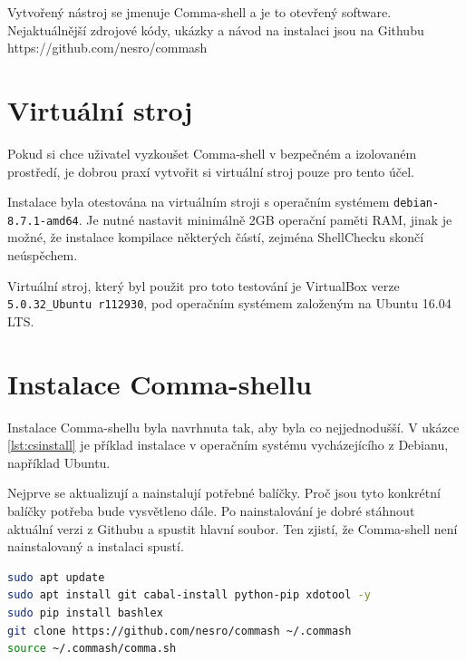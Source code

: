 \documentclass[thesis=M,czech]{FITthesis}[2012/06/26]
\begin{document}
Vytvořený nástroj se jmenuje Comma-shell a je to otevřený software. Nejaktuálnější zdrojové kódy, ukázky a návod na instalaci jsou na Githubu https://github.com/nesro/commash

%
\section{Virtuální stroj}

Pokud si chce uživatel vyzkoušet Comma-shell v bezpečném a izolovaném prostředí, je dobrou praxí vytvořit si virtuální stroj pouze pro tento účel.

Instalace byla otestována na virtuálním stroji s operačním systémem \texttt{debian-8.7.1-amd64}. Je nutné nastavit minimálně 2GB operační paměti RAM, jinak je možné, že instalace kompilace některých částí, zejména ShellChecku skončí neúspěchem.

Virtuální stroj, který byl použit pro toto testování je VirtualBox verze \texttt{5.0.32\_Ubuntu r112930}, pod operačním systémem založeným na Ubuntu 16.04 LTS.




\section{Instalace Comma-shellu}

Instalace Comma-shellu byla navrhnuta tak, aby byla co nejjednodušší. V ukázce \ref{lst:csinstall} je příklad instalace v operačním systému vycházejícího z Debianu, například Ubuntu.

Nejprve se aktualizují a nainstalují potřebné balíčky. Proč jsou tyto konkrétní balíčky potřeba bude vysvětleno dále. Po nainstalování je dobré stáhnout aktuální verzi z Githubu a spustit hlavní soubor. Ten zjistí, že Comma-shell není nainstalovaný a instalaci spustí.

\begin{minipage}{\linewidth}
\begin{lstlisting}[language=bash, caption={Instalace Comma-shellu}, label={lst:csinstall}]
sudo apt update
sudo apt install git cabal-install python-pip xdotool -y
sudo pip install bashlex
git clone https://github.com/nesro/commash ~/.commash
source ~/.commash/comma.sh
\end{lstlisting}
\end{minipage}
\end{document}
